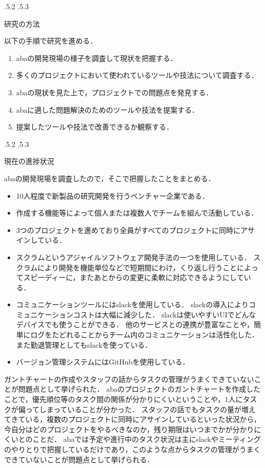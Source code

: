\documentclass[uplatex]{jsarticle}
\makeatletter
\renewcommand{\section}{%
    \if@slide\clearpage\fi
    \@startsection{section}{1}{\z@}%
    {\Cvs \@plus.5\Cdp \@minus.2\Cdp}%
    {.5\Cvs \@plus.3\Cdp}%
    {\normalfont\raggedright}}
\makeatother
\begin{document}
\section{研究の方法}

以下の手順で研究を進める．
\begin{enumerate}
\item abaの開発現場の様子を調査して現状を把握する．
\item 多くのプロジェクトにおいて使われているツールや技法について調査する．
\item abaの現状を見た上で，プロジェクトでの問題点を発見する．
\item abaに適した問題解決のためのツールや技法を提案する．
\item 提案したツールや技法で改善できるか観察する．
\end{enumerate}



\section{現在の進捗状況}

abaの開発現場を調査したので，そこで把握したことをまとめる．
\begin{itemize}
\item 10人程度で新製品の研究開発を行うベンチャー企業である．
\item 作成する機能等によって個人または複数人でチームを組んで活動している．
\item 3つのプロジェクトを進めており全員がすべてのプロジェクトに同時にアサインしている．
\item スクラムというアジャイルソフトウェア開発手法の一つを使用している\cite{nagase2012}．
スクラムにより開発を機能単位などで短期間にわけ，くり返し行うことによってスピーディーに，またあとからの変更に柔軟に対応できるようにしている．
\item コミュニケーションツールにはslackを使用している．
slackの導入によりコミュニケーションコストは大幅に減少した．
slackは使いやすいUIでどんなデバイスでも使うことができる．
他のサービスとの連携が豊富なことや，簡単にログをたどれることからチーム内のコミュニケーションは活性化した．
また勤退管理としてもslackを使っている．
\item バージョン管理システムにはGitHubを使用している．
\end{itemize}


ガントチャートの作成やスタッフの話からタスクの管理がうまくできていないことが問題点として挙げられた．
abaのプロジェクトのガントチャートを作成したことで，優先順位等のタスク間の関係が分かりにくいということや，1人にタスクが偏ってしまっていることが分かった．
スタッフの話でもタスクの量が増えてきている，複数のプロジェクトに同時にアサインしているといった状況から，今自分はどのプロジェクトをやるべきなのか，残り期限はいつまでかが分かりにくいとのことだ．
abaでは予定や進行中のタスク状況は主にslackやミーティングのやりとりで把握しているだけであり，このような点からタスクの管理がうまくできていないことが問題点として挙げられる．
\end{document}
